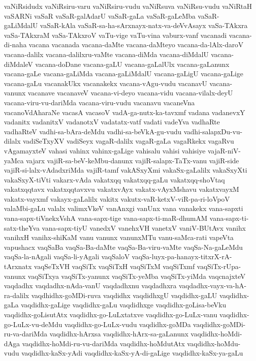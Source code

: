 {vaNiRsidudx
vaNiRsiru-varu
vaNiRsiru-vudu
vaNiRsuva
vaNiRsu-vudu
vaNiRtaH
vaSARNi
vaSaR
vaSaR-galAdarU
vaSaR-gaLa
vaSaR-gaLeMba
vaSaR-gaLiMdalU
vaSaR-kAla
vaSaR-sa-ha-sArxnayx-natx-va-deVvAsayx
vaSa-TAkxra
vaSa-TAkxraM
vaSa-TAkxroV
vaTu-vige
vaTu-vina
vaburx-vanf
vacanadi
vacana-di-naha
vacana
vacanada
vacana-daMte
vacana-daMteyo
vacana-da-lAlx-daroV
vacana-dalilx
vacana-dalilxru-vaMte
vacana-diMda
vacana-diMdalU
vacana-diMdaleV
vacana-doDane
vacana-gaLU
vacana-gaLalUlx
vacana-gaLanunx
vacana-gaLe
vacana-gaLiMda
vacana-gaLiMdalU
vacana-gaLigU
vacana-gaLige
vacana-gaLu
vacanakUkx
vacanakekx
vacana-vAgu-vudu
vacanavU
vacana-vanunx
vacanave
vacanaveV
vacana-vi-deyo
vacana-vidu
vacana-vilalx-deyU
vacana-viru-vu-dariMda
vacana-viru-vudu
vacanavu
vacaneVna
vacanoVdAharaNe
vacasA
vacasoV
vadA-ga-nutx-ka-tavxmf
vadana
vadanevxY
vadanitx
vadanitxV
vadanotxV
vadatatx-vatf
vadati
vadeYva
vadhaRte
vadhaRteV
vadhi-sa-bAra-deMdu
vadhi-sa-beVkA-gu-vudu
vadhi-salapxDu-vu-dilalx
vadiSeTxyXV
vadiSeyx
vagaR-dalilx
vagaR-gaLa
vagaRkekx
vagaRvu
vAgamayxteV
vahasi
vahinx
vahinx-gaLige
vahisalu
vahisi
vahisiye
vajaR-niV-yaMca
vajarx
vajiR-sa-beV-keMbu-danunx
vajiR-salapx-TaTx-vanu
vajiR-side
vajiR-si-lalx-vAdadxriMda
vajiR-tamf
vakASxyXmi
vakaSx-gaLalilx
vakaSxyXti
vakaSxyX-tiVti
vakarx-vAda
vakatxqq
vakatxqq-gaLu
vakatxqq-shoVtaq
vakatxqqtavx
vakatxqqtavxvu
vakatxvAyx
vakatx-vAyxMshavu
vakatxvayxM
vakatx-vayxmf
vakayx-gaLalilx
vakitx
vakutx-vaR-ketxV-viR-pa-ri-loVpoV
valaMbi-gaLu
valalx
valimxVkeV
vanAnxgi
vanUnx
vana
vanakekx
vana-sapxti
vana-sapx-tiVnekxVshA
vana-sapx-tige
vana-sapx-ti-maR-dhumAM
vana-sapx-ti-satx-theYva
vana-sapx-tiyU
vanedxV
vanehxVH
vanetxV
vaniV-BUtAvx
vanihx
vanihxH
vanihx-shiKaM
vanu
vanunx
vanunxMTu
vanu-saMca-rati
vapeVta
vapushacx
vaqSaBa
vaqSa-Ba-daMte
vaqSa-Ba-viru-vaMte
vaqSa-Na-gaLeMdu
vaqSa-la-nAgali
vaqSa-li-yAgali
vaqSaloV
vaqSa-luyx-pa-hanayx-titxrX-rA-tArxnatx
vaqSeTxVH
vaqSiTx
vaqSiTxH
vaqSiTxM
vaqSiTxmf
vaqSiTx-rUpa-vanunx
vaqSiTxya
vaqSiTx-yanunx
vaqSiTx-yeMba
vaqSiTx-yiMda
vaqcnajxteV
vaqdadhx
vaqdadhx-nAda-vanU
vaqdadhxnu
vaqdadhxra
vaqdadhx-vayx-va-hA-ra-dalilx
vaqdhidhx-goMDi-ruva
vaqdidhx
vaqdidhxgU
vaqdidhx-gaLU
vaqdidhx-gaLa
vaqdidhx-gaLige
vaqdidhx-gaLu
vaqdidhxge
vaqdidhx-goLisa-beVku
vaqdidhx-goLisutAtx
vaqdidhx-go-LuLxtatxve
vaqdidhx-go-LuLx-vanu
vaqdidhx-go-LuLx-vu-deMdu
vaqdidhx-go-LuLx-vudu
vaqdidhx-goMDa
vaqdidhx-goMDi-ru-va-dariMda
vaqdidhx-hArxsa
vaqdidhx-hArx-sa-gaLanunx
vaqdidhx-hoMdi-dAga
vaqdidhx-hoMdi-ru-vu-dariMda
vaqdidhx-hoMdutAtx
vaqdidhx-hoMdu-vudu
vaqdidhx-kaSx-yAdi
vaqdidhx-kaSx-yA-di-gaLige
vaqdidhx-kaSx-ya-gaLu
}
